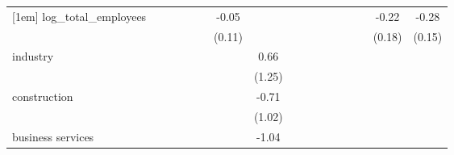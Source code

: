 \begin{table}[htbp]
\begin{tabular*}{0.8\hsize}{@{\hskip\tabcolsep\extracolsep\fill}l*{16}{c}}
[1em]
log\_total\_employees &                     &                     &                     &                     &                     &       -0.05         &                     &                     &                     &                     &                     &                     &                     &                     &       -0.22         &       -0.28\sym{*}  \\
                    &                     &                     &                     &                     &                     &      (0.11)         &                     &                     &                     &                     &                     &                     &                     &                     &      (0.18)         &      (0.15)         \\
[1em]
industry            &                     &                     &                     &                     &                     &                     &        0.66         &                     &                     &                     &                     &                     &                     &                     &                     &                     \\
                    &                     &                     &                     &                     &                     &                     &      (1.25)         &                     &                     &                     &                     &                     &                     &                     &                     &                     \\
[1em]
construction        &                     &                     &                     &                     &                     &                     &       -0.71         &                     &                     &                     &                     &                     &                     &                     &                     &                     \\
                    &                     &                     &                     &                     &                     &                     &      (1.02)         &                     &                     &                     &                     &                     &                     &                     &                     &                     \\
[1em]
business services   &                     &                     &                     &                     &                     &                     &       -1.04         &                     &                     &                     &                     &                     &                     &                     &                     &                     \\

\end{tabular*}
\end{table}
